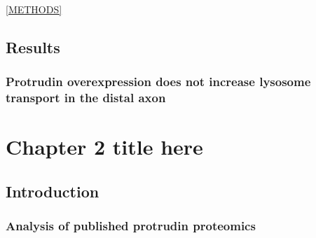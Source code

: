 \documentclass[
]{book}
\newenvironment{Shaded}{\begin{snugshade}}{\end{snugshade}}
\newcommand{\CommentTok}[1]{\textcolor[rgb]{0.56,0.35,0.01}{\textit{#1}}}
\newcommand{\DataTypeTok}[1]{\textcolor[rgb]{0.13,0.29,0.53}{#1}}
\newcommand{\KeywordTok}[1]{\textcolor[rgb]{0.13,0.29,0.53}{\textbf{#1}}}
\newcommand{\NormalTok}[1]{#1}
\newcommand{\OperatorTok}[1]{\textcolor[rgb]{0.81,0.36,0.00}{\textbf{#1}}}
\newcommand{\OtherTok}[1]{\textcolor[rgb]{0.56,0.35,0.01}{#1}}
\begin{document}
\ref{METHODS}

\hypertarget{results}{%
\section{Results}\label{results}}

\hypertarget{protrudin-overexpression-does-not-increase-lysosome-transport-in-the-distal-axon}{%
\subsection{Protrudin overexpression does not increase lysosome transport in the distal axon}\label{protrudin-overexpression-does-not-increase-lysosome-transport-in-the-distal-axon}}

\hypertarget{chapter-2-title-here}{%
\chapter{Chapter 2 title here}\label{chapter-2-title-here}}

\hypertarget{introduction-2}{%
\section{Introduction}\label{introduction-2}}

\lipsum

\hypertarget{analysis-of-published-protrudin-proteomics}{%
\subsection{Analysis of published protrudin proteomics}\label{analysis-of-published-protrudin-proteomics}}

\begin{Shaded}
\end{Shaded}
\end{document}
